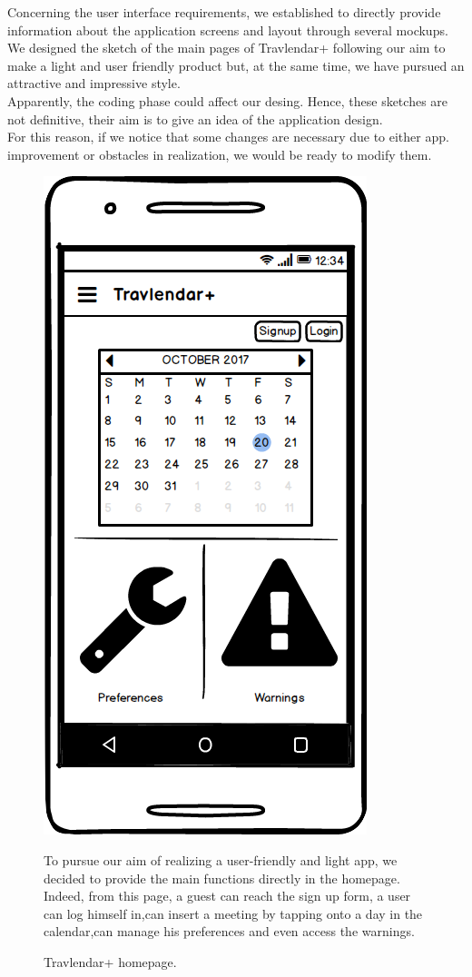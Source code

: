 
	\begin{flushleft}
		Concerning the user interface requirements, we established to directly provide information about the application screens and layout through several mockups. \\
		We designed the sketch of the main pages of Travlendar+ following our aim to make a light and user friendly product but, at the same time, we have pursued an attractive and impressive style. \\
		Apparently, the coding phase could affect our desing. Hence, these sketches are not definitive, their aim is to give an idea of the application design. \\
		For this reason, if we notice that some changes are necessary due to either app. improvement or obstacles in realization, we would be ready to modify them. 
	\end{flushleft}
	
	\begin{figure}
		\centering
		\includegraphics[width=0.6\linewidth]{mockups/Homepage}
		\caption{Travlendar+ homepage.  
		}
	\label{fig:homepage}
	\begin{center}
		To pursue our aim of realizing a user-friendly and light app, we decided to provide the main functions directly in the homepage. Indeed, from this page, a guest can reach the sign up form, a user can log himself in,can insert a meeting by tapping onto a day in the calendar,can manage his preferences and even access the warnings. \\ 
	\end{center}
	\end{figure}
	
